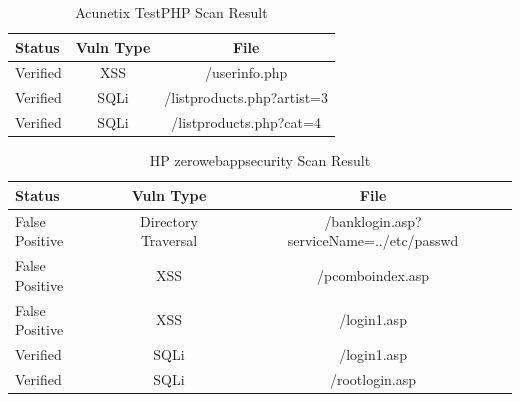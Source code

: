 \documentclass[12pt,a4paper]{article}
\begin{document}
\begin{center}
    \begin{table}
        \caption{Acunetix TestPHP Scan Result}
        \begin{center}
            \begin{tabular}{ | l | c | c | }
                \hline
                Status & Vuln Type & File \\ \hline
                Verified & XSS & /userinfo.php \\ \hline
                Verified & SQLi & /listproducts.php?artist=3 \\ \hline
                Verified & SQLi & /listproducts.php?cat=4 \\ 
                \hline
            \end{tabular}
        \end{center}
    \end{table}
\end{center}

\begin{center}
    \begin{table}
        \caption{HP zerowebappsecurity Scan Result}
        \begin{center}
            \begin{tabular}{ | l | c | c | }
                \hline
                Status & Vuln Type & File \\ \hline
                False Positive & Directory Traversal & /banklogin.asp?serviceName=../etc/passwd \\ \hline
                False Positive & XSS & /pcomboindex.asp \\ \hline
                False Positive & XSS & /login1.asp \\ \hline
                Verified & SQLi & /login1.asp \\ \hline
                Verified & SQLi & /rootlogin.asp \\
                \hline
            \end{tabular}
        \end{center}
    \end{table}
\end{center}
\end{document}
